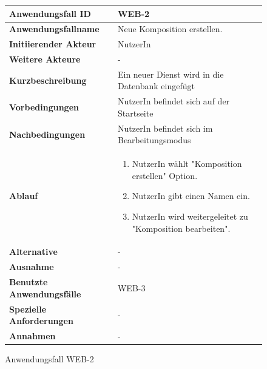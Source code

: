 \begin{figure}[h]
	\centering
	\begin{tabularx}{\textwidth}{ X | X }
		\textbf{Anwendungsfall ID} & WEB-2 \\ \hline
		\textbf{Anwendungsfallname} & Neue Komposition erstellen. \\ \hline
		\textbf{Initiierender Akteur} & NutzerIn \\ \hline
		\textbf{Weitere Akteure} & - \\ \hline
		\textbf{Kurzbeschreibung} & Ein neuer Dienst wird in die Datenbank eingefügt \\ \hline
		\textbf{Vorbedingungen} & NutzerIn befindet sich auf der Startseite  \\ \hline
		\textbf{Nachbedingungen} & NutzerIn befindet sich im Bearbeitungsmodus \\ \hline
		\textbf{Ablauf} &
		\begin{enumerate}
			\item  NutzerIn wählt "Komposition erstellen" Option.
			\item  NutzerIn gibt einen Namen ein.
			\item  NutzerIn wird weitergeleitet zu "Komposition bearbeiten".
		\end{enumerate} \\ \hline
		\textbf{Alternative} & - \\ \hline
		\textbf{Ausnahme} & - \\ \hline
		\textbf{Benutzte Anwendungsfälle} & WEB-3 \\ \hline
		\textbf{Spezielle Anforderungen} & - \\ \hline
		\textbf{Annahmen} & -
	\end{tabularx}
	\caption{Anwendungsfall WEB-2}
	\label{fig:anwendungsfall-server-tabelle-web-2}
\end{figure}

